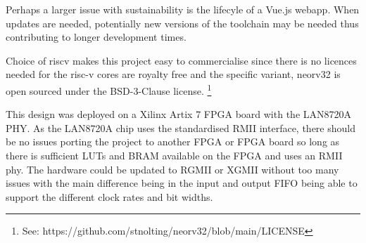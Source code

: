 Perhaps a larger issue with sustainability is the lifecyle of a Vue.js webapp. When updates are needed, potentially new versions of the toolchain may be needed thus contributing to longer development times. 

Choice of riscv makes this project easy to commercialise since there is no licences needed for the risc-v cores are royalty free and the specific variant, neorv32 is open sourced under the BSD-3-Clause license. \footnote[1]{See: https://github.com/stnolting/neorv32/blob/main/LICENSE}

This design was deployed on a Xilinx Artix 7 FPGA board with the LAN8720A PHY. As the LAN8720A chip uses the standardised RMII interface, there should be no issues porting the project to another FPGA or FPGA board so long as there is sufficient LUTs and BRAM available on the FPGA and uses an RMII phy. The hardware could be updated to RGMII or XGMII without too many issues with the main difference being in the input and output FIFO being able to support the different clock rates and bit widths.  